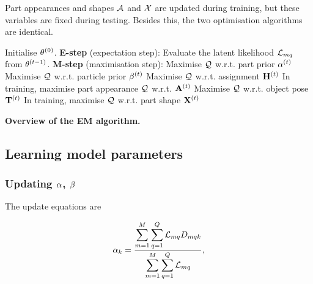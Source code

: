 Part appearances and shapes $\mathcal{A}$ and $\mathcal{X}$ are updated during training, but these variables are fixed during testing. Besides this, the two optimisation algorithms are identical. 

\begin{algorithm} 
	\begin{algorithmic}
		\STATE Initialise $\theta^{(0)}$.
		\REPEAT
		\STATE \textbf{E-step} (expectation step): 
		\STATE \hspace{\algorithmicindent} Evaluate the latent likelihood $\mathcal{L}_{mq}$ from $\theta^{(t-1)}$.   
		\STATE \textbf{M-step} (maximisation step): 
		\STATE \hspace{\algorithmicindent} Maximise $\mathcal{Q}$ w.r.t. part prior ${\alpha}^{(t)}$
		\STATE \hspace{\algorithmicindent} Maximise $\mathcal{Q}$ w.r.t. particle prior ${\beta}^{(t)}$
		\STATE \hspace{\algorithmicindent} Maximise $\mathcal{Q}$ w.r.t. assignment $\mathbf{H}^{(t)}$
		\STATE \hspace{\algorithmicindent} In training, maximise part appearance $\mathcal{Q}$ w.r.t. $\mathbf{A}^{(t)}$ 
		\STATE \hspace{\algorithmicindent} Maximise $\mathcal{Q}$ w.r.t. object pose $\mathbf{T}^{(t)}$
		\STATE \hspace{\algorithmicindent} In training, maximise $\mathcal{Q}$ w.r.t. part shape $\mathbf{X}^{(t)}$
	\end{algorithmic}
	\caption{\textbf{Overview of the EM algorithm.}}
	\label{algo/reg/em}
\end{algorithm} 

\subsection{Learning model parameters} 

\subsubsection{Updating ${\alpha}$, ${\beta}$}  The update equations are

\begin{equation}
	{\alpha}_{k} = \frac{\displaystyle\sum_{m=1}^M \sum_{q = 1}^{Q} \mathcal{L}_{mq}{D}_{mqk}}{\displaystyle\sum_{m=1}^M \sum_{q = 1}^{Q} \mathcal{L}_{mq}}, 
\end{equation}

